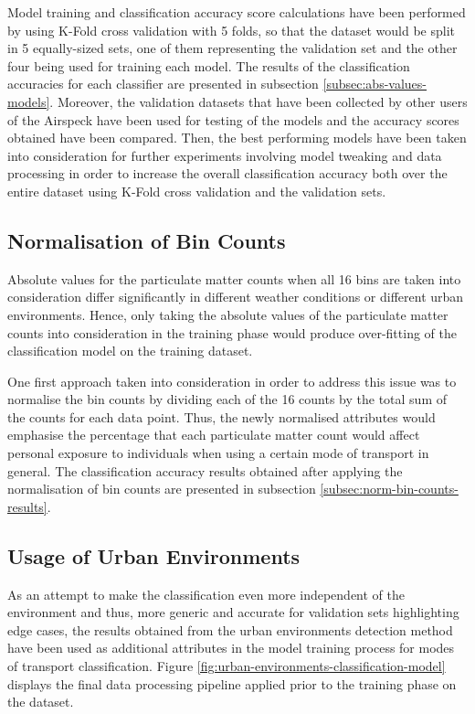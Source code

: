 \documentclass[bsc,frontabs,twoside,singlespacing, parskip,deptreport]{infthesis}     %
\begin{document}
Model training and classification accuracy score calculations have been performed by using K-Fold cross validation with 5 folds, so that the dataset would be split in 5 equally-sized sets, one of them representing the validation set and the other four being used for training each model. The results of the classification accuracies for each classifier are presented in subsection \ref{subsec:abs-values-models}. Moreover, the validation datasets that have been collected by other users of the Airspeck have been used for testing of the models and the accuracy scores obtained have been compared. Then, the best performing models have been taken into consideration for further experiments involving model tweaking and data processing in order to increase the overall classification accuracy both over the entire dataset using K-Fold cross validation and the validation sets.

\subsection{Normalisation of Bin Counts}
\label{subsec:bin-count-normalisation}

Absolute values for the particulate matter counts when all 16 bins are taken into consideration differ significantly in different weather conditions or different urban environments. Hence, only taking the absolute values of the particulate matter counts into consideration in the training phase would produce over-fitting of the classification model on the training dataset.

One first approach taken into consideration in order to address this issue was to normalise the bin counts by dividing each of the 16 counts by the total sum of the counts for each data point. Thus, the newly normalised attributes would emphasise the percentage that each particulate matter count would affect personal exposure to individuals when using a certain mode of transport in general. The classification accuracy results obtained after applying the normalisation of bin counts are presented in subsection \ref{subsec:norm-bin-counts-results}.

\subsection{Usage of Urban Environments}

As an attempt to make the classification even more independent of the environment and thus, more generic and accurate for validation sets highlighting edge cases, the results obtained from the urban environments detection method have been used as additional attributes in the model training process for modes of transport classification. Figure \ref{fig:urban-environments-classification-model} displays the final data processing pipeline applied prior to the training phase on the dataset.
\end{document}
